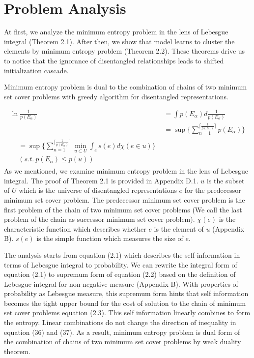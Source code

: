 
\section{Problem Analysis}
At first, we analyze the minimum entropy problem in the lens of Lebesgue integral (Theorem 2.1).
After then, we show that model learns to cluster the elements by minimum entropy problem (Theorem 2.2).
These theorems drive us to notice that the ignorance of disentangled relationships leads to shifted initialization cascade. 

\begin{theorem}
\label{thm:min_entropy_min_setcover}
Minimum entropy problem is dual to the combination of chains of two minimum set cover problems with greedy algorithm for disentangled representations. 
\end{theorem}
\begin{align}
\label{eq:thm_min_entropy_min_setcover}
\ln {\frac{1}{p(E_\alpha)}} &=\int p(E_\alpha)d{\frac{1}{p(E_\alpha)}}\\
                          &=\sup\{\sum_{n=1}^{\lceil{\frac{1}{p(E_\alpha)}}\rceil}p(E_\alpha)\}\\  
\begin{split}
                          &=\sup\{\sum_{n=1}^{\lceil{\frac{1}{p(E_\alpha)}}\rceil}\min_{u \subset U}\int_e s(e)d\chi(e \in u)\}\\
                          &(s.t.\ p(E_\alpha) \leq p(u))
\end{split}
\end{align}
As we mentioned, we examine minimum entropy problem in the lens of Lebesgue integral.
The proof of Theorem 2.1 is provided in Appendix D.1.
$u$ is the subset of $U$ which is the universe of disentangled representations $e$ for the predecessor minimum set cover problem.
The predecessor minimum set cover problem is the first problem of the chain of two minimum set cover problems
(We call the last problem of the chain as successor minimum set cover problem).
$\chi(e)$ is the characteristic function which describes whether $e$ is the element of $u$ (Appendix B).
$s(e)$ is the simple function which measures the size of $e$.

The analysis starts from equation (2.1) which describes the self-information in terms of Lebesgue integral to probability.
We can rewrite the integral form of equation (2.1) to supremum form of equation (2.2) based on the definition of Lebesgue integral 
for non-negative measure (Appendix B).
With properties of probability as Lebesgue measure, this supremum form hints that self information becomes the tight upper bound 
for the cost of solution to the chain of minimum set cover problems equation (2.3). 
This self information linearly combines to form the entropy.
Linear combinations do not change the direction of inequality in equation (36) and (37).
As a result, minimum entropy problem is dual form of the combination of chains of two minimum set cover problems by weak duality theorem.

